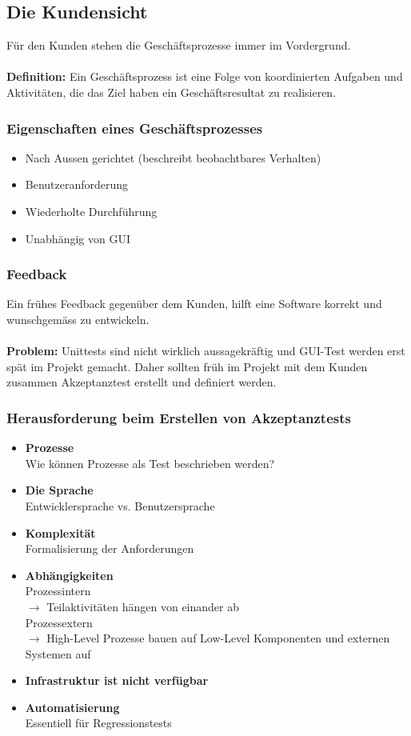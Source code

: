 \documentclass[a4paper,10pt]{article}
\newcommand{\Bold}[1]{\textbf{#1}} %
\begin{document}
\subsection{Die Kundensicht}
Für den Kunden stehen die Gesch\"aftsprozesse immer im Vordergrund.\\\\
\textbf{\Bold Definition:} Ein Gesch\"aftsprozess ist eine Folge von koordinierten Aufgaben und Aktivit\"aten, die das Ziel haben ein Gesch\"aftsresultat zu realisieren.

\subsubsection{Eigenschaften eines Gesch\"aftsprozesses}
\begin{itemize}
\item Nach Aussen gerichtet (beschreibt beobachtbares Verhalten)
\item Benutzeranforderung
\item Wiederholte Durchführung
\item Unabh\"angig von GUI
\end{itemize}

\subsubsection{Feedback}
Ein frühes Feedback gegenüber dem Kunden, hilft eine Software korrekt und wunschgem\"ass zu entwickeln.\\\\
\textbf{\Bold Problem:} Unittests sind nicht wirklich aussagekr\"aftig und GUI-Test werden erst sp\"at im Projekt gemacht. Daher sollten früh im Projekt mit dem Kunden zusammen Akzeptanztest erstellt und definiert werden.

\subsubsection{Herausforderung beim Erstellen von Akzeptanztests}
\begin{itemize}
\item \textbf{\Bold Prozesse}\\ 
Wie k\"onnen Prozesse als Test beschrieben werden?
\item \textbf{\Bold Die Sprache}\\
Entwicklersprache vs. Benutzersprache
\item \textbf{\Bold Komplexit\"at}\\
Formalisierung der Anforderungen
\item \textbf{\Bold Abh\"angigkeiten}\\
Prozessintern\\
$\rightarrow$ Teilaktivit\"aten h\"angen von einander ab\\
Prozessextern\\
$\rightarrow$ High-Level Prozesse bauen auf Low-Level Komponenten und externen Systemen auf
\item \textbf{\Bold Infrastruktur ist nicht verfügbar}
\item \textbf{\Bold Automatisierung}\\
Essentiell für Regressionstests
\end{itemize}
\end{document}
